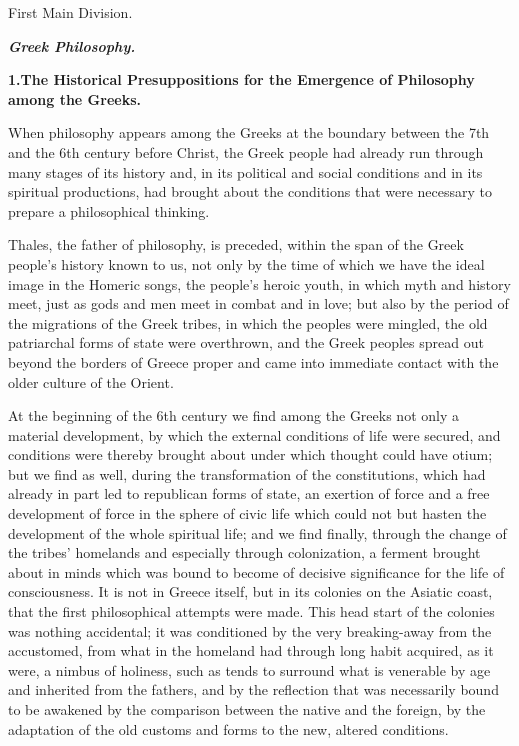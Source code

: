 \dblrule

\begin{center}
{\Large First Main Division.}
\end{center}

\divrule

\begin{center}
{\Large\textbf{\emph{Greek Philosophy.}}}
\end{center}

\divrule

\begin{center}
\textbf{1.\enspace The Historical Presuppositions for the Emergence of Philosophy\\
among the Greeks.}
\end{center}

When philosophy appears among the Greeks at the boundary between the 7th and
the 6th century before Christ, the Greek people had already run through many
stages of its history and, in its political and social conditions and in its
spiritual productions, had brought about the conditions that were necessary
to prepare a philosophical thinking.

Thales, the father of philosophy, is preceded, within the span of the Greek
people's history known to us, not only by the time of which we have the ideal
image in the Homeric songs, the people's heroic youth, in which myth and
history meet, just as gods and men meet in combat and in love; but also by the
period of the migrations of the Greek tribes, in which the peoples were
mingled, the old patriarchal forms of state were overthrown, and the Greek
peoples spread out beyond the borders of Greece proper and came into immediate
contact with the older culture of the Orient.

At the beginning of the 6th century we find among the Greeks not only a
material development, by which the external conditions of life were secured,
and conditions were thereby brought about under which thought could have
otium; but we find as well, during the transformation of the
constitutions, which had already in part led to republican forms of state, an
exertion of force and a free development of force in the sphere of civic life
which could not but hasten the development of the whole spiritual life; and we
find finally, through the change of the tribes' homelands and especially
through colonization, a ferment brought about in minds which was bound to
become of decisive significance for the life of consciousness. It is not in
Greece itself, but in its colonies on the Asiatic coast, that the first
philosophical attempts were made. This head start of the colonies was nothing
accidental; it was conditioned by the very breaking-away from the accustomed,
from what in the homeland had through long habit acquired, as it were, a
nimbus of holiness, such as tends to surround what is venerable by age and
inherited from the fathers, and by the reflection that was necessarily bound
to be awakened by the comparison between the native and the foreign, by the
adaptation of the old customs and forms to the new, altered conditions.

